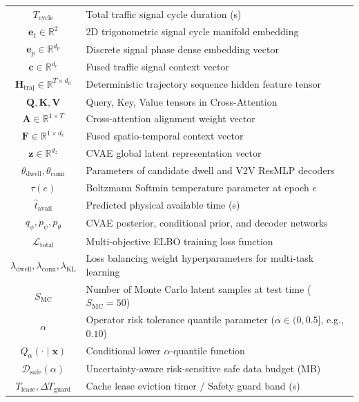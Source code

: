 \documentclass[journal]{IEEEtran}
\begin{document}
\begin{table}[!t]
{\begin{tabular}{c|l}
$T_{\text{cycle}}$ & Total traffic signal cycle duration (s) \\
$\mathbf{e}_t \in \mathbb{R}^2$ & 2D trigonometric signal cycle manifold embedding \\
$\mathbf{e}_p \in \mathbb{R}^{d_p}$ & Discrete signal phase dense embedding vector \\
$\mathbf{c} \in \mathbb{R}^{d_c}$ & Fused traffic signal context vector \\
$\mathbf{H}_{\text{traj}} \in \mathbb{R}^{T \times d_h}$ & Deterministic trajectory sequence hidden feature tensor \\
$\mathbf{Q}, \mathbf{K}, \mathbf{V}$ & Query, Key, Value tensors in Cross-Attention \\
$\mathbf{A} \in \mathbb{R}^{1 \times T}$ & Cross-attention alignment weight vector \\
$\mathbf{F} \in \mathbb{R}^{1 \times d_v}$ & Fused spatio-temporal context vector \\
$\mathbf{z} \in \mathbb{R}^{d_z}$ & CVAE global latent representation vector \\
$\theta_{\text{dwell}}, \theta_{\text{conn}}$ & Parameters of candidate dwell and V2V ResMLP decoders \\
$\tau(e)$ & Boltzmann Softmin temperature parameter at epoch $e$ \\
$\hat{t}_{\text{avail}}$ & Predicted physical available time (s) \\
$q_\phi, p_\psi, p_\theta$ & CVAE posterior, conditional prior, and decoder networks \\
$\mathcal{L}_{\text{total}}$ & Multi-objective ELBO training loss function \\
$\lambda_{\text{dwell}}, \lambda_{\text{conn}}, \lambda_{\text{KL}}$ & Loss balancing weight hyperparameters for multi-task learning \\
$S_{\text{MC}}$ & Number of Monte Carlo latent samples at test time ($S_{\text{MC}} = 50$) \\
$\alpha$ & Operator risk tolerance quantile parameter ($\alpha \in (0, 0.5]$, e.g., $0.10$) \\
$Q_\alpha(\cdot \mid \mathbf{x})$ & Conditional lower $\alpha$-quantile function \\
$\mathcal{D}_{\text{safe}}(\alpha)$ & Uncertainty-aware risk-sensitive safe data budget (MB) \\
$T_{\text{lease}}, \Delta T_{\text{guard}}$ & Cache lease eviction timer / Safety guard band (s) \\
\bottomrule
\end{tabular}%
}
\end{table}
\end{document}
